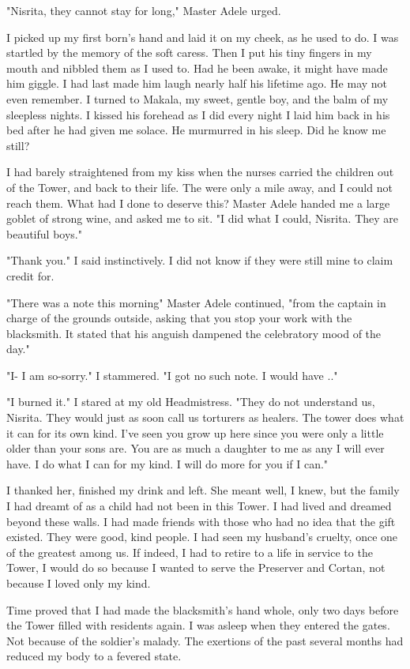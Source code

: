 \documentclass{article}
\begin{document}
"Nisrita, they cannot stay for long," Master Adele urged. 

I picked up my first born's hand and laid it on my cheek, as he used to do. I was startled by the memory of the soft caress. Then I put his tiny fingers in my mouth and nibbled them as I used to. Had he been awake, it might have made him giggle. I had last made him laugh nearly half his lifetime ago. He may not even remember. I turned to Makala, my sweet, gentle boy, and the balm of my sleepless nights. I kissed his forehead as I did every night I laid him back in his bed after he had given me solace. He murmurred in his sleep. Did he know me still?

I had barely straightened from my kiss when the nurses carried the children out of the Tower, and back to their life. The were only a mile away, and I could not reach them. What had I done to deserve this? Master Adele handed me a large goblet of strong wine, and asked me to sit. "I did what I could, Nisrita. They are beautiful boys."

"Thank you." I said instinctively. I did not know if they were still mine to claim credit for. 

"There was a note this morning" Master Adele continued, "from the captain in charge of the grounds outside, asking that you stop your work with the blacksmith. It stated that his anguish dampened the celebratory mood of the day."

"I- I am so-sorry." I stammered. "I got no such note. I would have .."

"I burned it." I stared at my old Headmistress. "They do not understand us, Nisrita. They would just as soon call us torturers as healers. The tower does what it can for its own kind. I've seen you grow up here since you were only a little older than your sons are. You are as much a daughter to me as any I will ever have. I do what I can for my kind. I will do more for you if I can."

I thanked her, finished my drink and left. She meant well, I knew, but the family I had dreamt of as a child had not been in this Tower. I had lived and dreamed beyond these walls. I had made friends with those who had no idea that the gift existed. They were good, kind people. I had seen my husband's cruelty, once one of the greatest among us. If indeed, I had to retire to a life in service to the Tower, I would do so because I wanted to serve the Preserver and Cortan, not because I loved only my kind.

Time proved that I had made the blacksmith's hand whole, only two days before the Tower filled with residents again. I was asleep when they entered the gates. Not because of the soldier's malady. The exertions of the past several months had reduced my body to a fevered state.
\end{document}

